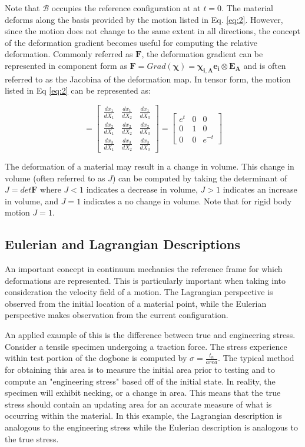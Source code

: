 \documentclass[a4paper]{article}
\begin{document}
Note that $\mathcal{B}$ occupies the reference configuration at at $t=0$. 
The material deforms along the basis provided by the motion listed in Eq. \ref{eq:2}. However, since the motion does not change to the same extent in all directions, the concept of the deformation gradient becomes useful for computing the relative deformation. Commonly referred as $\mathbf{F}$, the deformation gradient can be represented in component form as $\mathbf{F} = Grad (\boldsymbol{\chi}) = \boldsymbol{\chi_{i,A}} \mathbf{e_i} \otimes \mathbf{E_A}$ and is often referred to as the Jacobina of the deformation map. In tensor form, the motion listed in Eq \ref{eq:2} can be represented as: 

\begin{equation}
    [F_{i,A}] = 
    \begin{bmatrix}
    \frac{dx_1}{dX_1} & \frac{dx_1}{dX_2} & \frac{dx_1}{dX_3} \\
    \frac{dx_2}{dX_1} & \frac{dx_2}{dX_2} & \frac{dx_2}{dX_3} \\
    \frac{dx_3}{dX_1} & \frac{dx_3}{dX_2} & \frac{dx_3}{dX_3}
  \end{bmatrix} = 
  \begin{bmatrix}
    e^t & 0 & 0 \\
    0 & 1 & 0 \\
    0 & 0 & e^{-t}
  \end{bmatrix}
\end{equation}

The deformation of a material may result in a change in volume. This change in volume (often referred to as $J$) can be computed by taking the determinant of $J = det\mathbf{F}$ where $J<1$ indicates a decrease in volume, $J>1$ indicates an increase in volume, and $J=1$ indicates a no change in volume. Note that for rigid body motion $J=1$. 

\subsection{Eulerian and Lagrangian Descriptions}

An important concept in continuum mechanics the reference frame for which deformations are represented. This is particularly important when taking into consideration the velocity field of a motion. The Lagrangian perspective is observed from the initial location of a material point, while the Eulerian perspective makes observation from the current configuration. 

An applied example of this is the difference between true and engineering stress. Consider a tensile specimen undergoing a traction force. The stress experience within test portion of the dogbone is computed by $\sigma = \frac{t_n}{area}$. The typical method for obtaining this area is to measure the initial area prior to testing and to compute an "engineering stress" based off of the initial state. In reality, the specimen will exhibit necking, or a change in area. This means that the true stress should contain an updating area for an accurate measure of what is occurring within the material. In this example, the Lagrangian description is analogous to the engineering stress while the Eulerian description is analogous to the true stress. 
\end{document}
